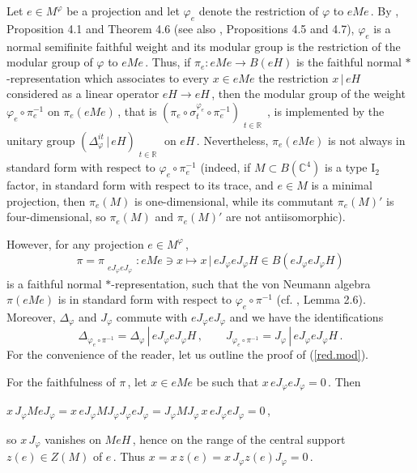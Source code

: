 \documentclass[reqno]{amsart}
\theoremstyle{definition}
\theoremstyle{remark}
\numberwithin{equation}{section}
\theoremstyle{plain}
\begin{document}
Let $e\in M^\varphi$ be a projection and let $\varphi_e$ denote
the restriction of $\varphi$ to $e M e\,$.
By \cite{P-T}, Proposition 4.1 and Theorem 4.6
(see also \cite{S}, Propositions 4.5 and 4.7), $\varphi_e$ is a
normal semifinite faithful weight and its modular group is the
restriction of the modular group of $\varphi$ to $e M e\,$.
Thus, if $\pi_e : e M e\longrightarrow B(e H)$ is the
faithful normal $*$-representation which associates to every
$x\in e M e$ the restriction $x\, |\, e H$ considered as a linear
operator $e H\rightarrow e H\,$, then the modular group of the
weight $\varphi_e\circ\pi_e^{-1}$ on $\pi_e (e M e)\,$, that
is $(\pi_e\circ\sigma^{\varphi_e}_t\circ\pi_e^{-1})_{
\substack{{}\\ t\in\mathbb R}}\,$, is implemented by the unitary
group $(\Delta_\varphi^{i t}\, |\, e H)_{
\substack{{}\\ t\in\mathbb R}}$ on $e H\,$. Nevertheless,
$\pi_e (e M e)$ is not always in standard form with respect to
$\varphi_e\circ\pi_e^{-1}$ (indeed, if $M\subset B(\mathbb C^4 )$
is a type I$_2$ factor, in standard form with respect to its
trace, and $e\in M$ is a minimal projection, then $\pi_e (M)$ is
one-dimensional, while its commutant $\pi_e (M)'$ is
four-dimensional, so $\pi_e (M)$ and $\pi_e (M)'$ are not
antiisomorphic).

However, for any projection $e\in M^\varphi\,$,
\begin{equation}\label{stand.red}
\pi =\pi_{\substack{{}\\ e J_\varphi e J_\varphi}} : e M e\ni
x\longmapsto x\, |\, e J_\varphi e J_\varphi H \in B(e J_\varphi
e J_\varphi H)
\end{equation}
is a faithful normal $*$-representation, such that the von Neumann
algebra $\pi (e M e)$ is in standard form with respect to
$\varphi_e\circ\pi^{-1}$ (cf. \cite{Haa1}, Lemma 2.6). Moreover,
$\Delta_\varphi$ and $J_\varphi$ commute with $e J_\varphi e
J_\varphi$ and we have the identifications
\begin{equation}\label{red.mod}
\Delta_{\varphi_e\circ\pi^{-1}} =\Delta_\varphi\, |\, e J_\varphi
e J_\varphi H\, ,\qquad J_{\varphi_e\circ\pi^{-1}} =
J_\varphi\, |\, e J_\varphi e J_\varphi H\, .
\end{equation}
For the convenience of the reader, let us outline the proof of
(\ref{red.mod}).

For the faithfulness of $\pi\,$, let $x\in e M e$ be such that
$x\, eJ_\varphi eJ_\varphi =0\,$. Then
\smallskip
\begin{center}
$x\, J_\varphi M eJ_\varphi =x\, eJ_\varphi MJ_\varphi J_\varphi
eJ_\varphi =J_\varphi MJ_\varphi\, x\, eJ_\varphi eJ_\varphi =0\,$,
\end{center}
\smallskip
so $x\, J_\varphi$ vanishes on $M e H\,$, hence on the range of
the central support $z(e)\in Z(M)$ of $e\,$. Thus $x=x\, z(e)=
x\, J_\varphi z(e) J_\varphi =0\,$.
\end{document}
